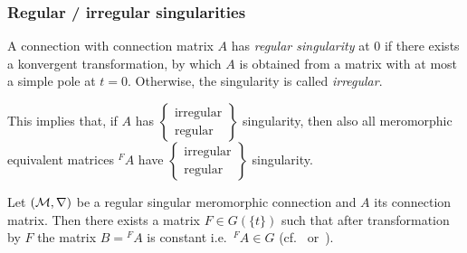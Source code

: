 \subsubsection{Regular / irregular singularities}
\begin{defn}
  A connection with connection matrix $A$ has \emph{regular singularity} at $0$
  if there exists a konvergent transformation, by which $A$ is obtained from a
  matrix with at most a simple pole at $t=0$.
  Otherwise, the singularity is called \emph{irregular}.
  \begin{s-rem}
    This implies that, if $A$ has
    $\left\{\substack{\text{irregular}\\\text{regular}}\right\}$
    singularity, then also all
    meromorphic equivalent matrices ${}^{F}\!A$ have
    $\left\{\substack{\text{irregular}\\\text{regular}}\right\}$
    singularity.
  \end{s-rem}
  \begin{comment}
    \begin{s-rem}
      \marginnote{\cite[150]{van2003galois}}
      One can express this notion of regular singular also in terms of
      $\delta:=t\frac{d}{dt}$. A system has regular singularity if it is
      equivalent to an equation $\delta-A$ where $A$ has entries in
      holomorphic functions in a neighbourhood of $z=0$.
    \end{s-rem}
  \end{comment}
\end{defn}
\begin{thm}
  Let $(\mathcal{M},\nabla)$ be a regular singular meromorphic connection and $A$ its
  connection matrix.
  Then there exists a matrix $F\in G(\!\{t\}\!)$ such that after transformation
  by $F$ the matrix $B={}^F\!A$ is constant i.e.\ ${}^F\!A\in G$
  (cf.~\cite[Thm.II.2.8]{sabbah2007isomonodromic}
  or~\cite[Sec.5.1.2]{hotta2008}).
\end{thm}

